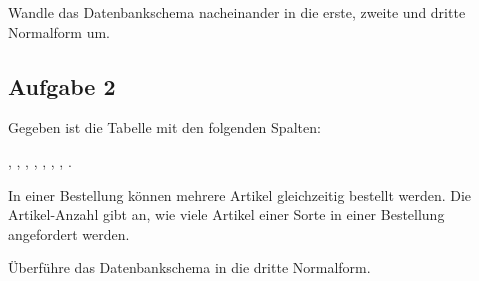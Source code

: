 Wandle das Datenbankschema nacheinander in die erste, zweite und dritte
Normalform um.


\subsection{Aufgabe 2}

Gegeben ist die Tabelle  mit den folgenden Spalten:

, ,
, ,
, ,
, .

In einer Bestellung können mehrere Artikel gleichzeitig bestellt werden. Die
Artikel-Anzahl gibt an, wie viele Artikel einer Sorte in einer Bestellung
angefordert werden.

Überführe das Datenbankschema in die dritte Normalform.